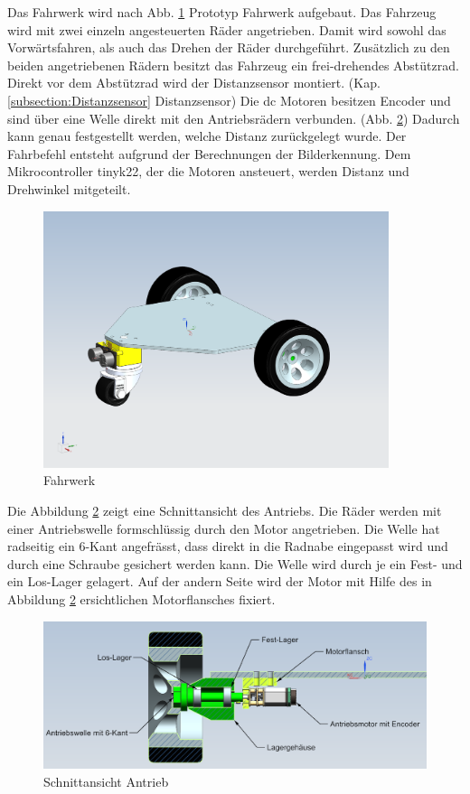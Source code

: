 Das Fahrwerk wird nach Abb.  \ref{fig:Prototype_Fahrwerk_CAD}  Prototyp Fahrwerk aufgebaut. Das Fahrzeug wird mit zwei einzeln angesteuerten Räder angetrieben. Damit wird sowohl das Vorwärtsfahren, als auch das Drehen der Räder durchgeführt. Zusätzlich zu den beiden angetriebenen Rädern besitzt das Fahrzeug ein frei-drehendes Abstützrad. Direkt vor dem Abstützrad wird der Distanzsensor montiert. (Kap. \ref{subsection:Distanzsensor} Distanzsensor) Die \acrfull{dc} Motoren besitzen Encoder und sind über eine Welle direkt mit den Antriebsrädern verbunden. (Abb. \ref{fig:sectionview-wheelmount}) Dadurch kann genau festgestellt werden, welche Distanz zurückgelegt wurde. Der Fahrbefehl entsteht aufgrund der Berechnungen der Bilderkennung. Dem Mikrocontroller \gls{tinyk22}, der die Motoren ansteuert, werden Distanz und Drehwinkel mitgeteilt. 

\begin{figure}[H]
\centering
\includegraphics[width=0.9\textwidth]{assets/prototyp-fahrwerk/Prototyp_Fahrwerk_CAD.png}
\caption{Fahrwerk}
\label{fig:Prototype_Fahrwerk_CAD}
\end{figure}

Die Abbildung \ref{fig:sectionview-wheelmount} zeigt eine Schnittansicht des Antriebs. Die Räder werden mit einer Antriebswelle formschlüssig durch den Motor angetrieben. Die Welle hat radseitig ein 6-Kant angefrässt, dass direkt in die Radnabe eingepasst wird und durch eine Schraube gesichert werden kann. Die Welle wird durch je ein Fest- und ein Los-Lager gelagert. Auf der andern Seite wird der Motor mit Hilfe des in Abbildung \ref{fig:sectionview-wheelmount} ersichtlichen Motorflansches fixiert. 

\begin{figure}[H]
\centering
\includegraphics[width=1.0\textwidth]{img/Antrieb.png}
\caption{Schnittansicht Antrieb}
\label{fig:sectionview-wheelmount}
\end{figure}


